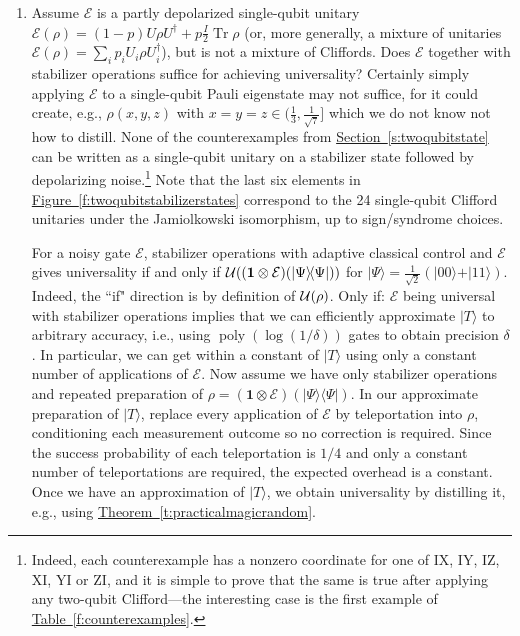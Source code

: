 \documentclass[11pt]{article}
\def\ket #1{\vert #1\rangle}
\def\bra #1{\langle #1\vert}
\def\ketbra #1#2{\ket{#1}\!\bra{#2}}
\DeclareMathOperator{\tr}{Tr}%
\theoremstyle{note}
\newcommand{\thmref}[1]{\hyperref[#1]{{Theorem~\ref*{#1}}}}
\newcommand{\secref}[1]{\hyperref[#1]{{Section~\ref*{#1}}}}
\newcommand{\figref}[1]{\hyperref[#1]{{Figure~\ref*{#1}}}}
\newcommand{\tabref}[1]{\hyperref[#1]{{Table~\ref*{#1}}}}
\DeclareMathOperator{\poly}{\operatorname{poly}}
\begin{document}
\begin{enumerate}
\item
Assume $\mathcal E$ is a partly depolarized single-qubit unitary $\mathcal E(\rho) = (1-p) U \rho U^\dagger + p\tfrac{I}{2}\tr\rho$ (or, more generally, a mixture of unitaries $\mathcal E(\rho) = \sum_i p_i U_i \rho U_i^\dagger$), but is not a mixture of Cliffords.  Does $\mathcal E$ together with stabilizer operations suffice for achieving universality?  Certainly simply applying $\mathcal E$ to a single-qubit Pauli eigenstate may not suffice, for it could create, e.g., $\rho(x,y,z)$ with $x=y=z \in (\tfrac{1}{3}, \tfrac{1}{\sqrt 7}]$ which we do not know not how to distill.  None of the counterexamples from \secref{s:twoqubitstate} can be written as a single-qubit unitary on a stabilizer state followed by depolarizing noise.\footnote{Indeed, each counterexample has a nonzero coordinate for one of IX, IY, IZ, XI, YI or ZI, and it is simple to prove that the same is true after applying any two-qubit Clifford---the interesting case is the first example of \tabref{f:counterexamples}.}  Note that the last six elements in \figref{f:twoqubitstabilizerstates} correspond to the 24 single-qubit Clifford unitaries under the Jamiolkowski isomorphism, up to sign/syndrome choices.

For a noisy gate $\mathcal E$, stabilizer operations with adaptive classical control and $\mathcal E$ gives universality if and only if $\magic{({\boldsymbol 1} \otimes \mathcal E)(\ketbra \Psi \Psi)}$ for $\ket{\Psi} = \tfrac{1}{\sqrt 2}(\ket{00}+\ket{11})$.  Indeed, the ``if" direction is by definition of $\mathcal{U}(\rho)$.  Only if: $\mathcal E$ being universal with stabilizer operations implies that we can efficiently approximate $\ket T$ to arbitrary accuracy, i.e., using $\poly(\log(1/\delta))$ gates to obtain precision $\delta$.  In particular, we can get within a constant of $\ket T$ using only a constant number of applications of $\mathcal E$.  Now assume we have only stabilizer operations and repeated preparation of $\rho = ({\boldsymbol 1} \otimes \mathcal E)(\ketbra{\Psi}{\Psi})$.  In our approximate preparation of $\ket T$, replace every application of $\mathcal E$ by teleportation into $\rho$, conditioning each measurement outcome so no correction is required.  Since the success probability of each teleportation is $1/4$ and only a constant number of teleportations are required, the expected overhead is a constant.  Once we have an approximation of $\ket T$, we obtain universality by distilling it, e.g., using \thmref{t:practicalmagicrandom}.  


\end{enumerate}
\end{document}
